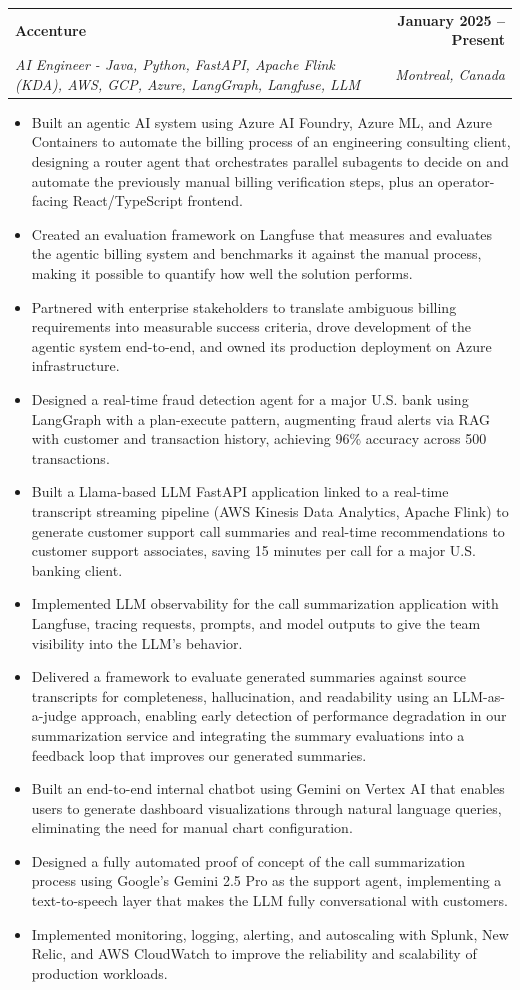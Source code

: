 \documentclass[letterpaper,11pt]{article}
\makeatletter
\newcommand{\resumeItem}[1]{
  \item\small{{#1 \vspace{-2pt}}}
}
\newcommand{\resumeSubheading}[4]{
  \vspace{-2pt}\item
    \begin{tabularx}{1.0\textwidth}[t]{@{}>{\raggedright\arraybackslash}X@{\hspace{8pt}}r@{}}
      \textbf{#1} & \textbf{\small #2} \\
      \textit{\small#3} & \textit{\small #4} \\
    \end{tabularx}\vspace{-7pt}
}
\newcommand{\resumeItemListStart}{\begin{itemize}}
\newcommand{\resumeItemListEnd}{\end{itemize}\vspace{-5pt}}
\makeatother
\begin{document}
    \resumeSubheading
      {Accenture}{January 2025 -- Present}
      {AI Engineer - Java, Python, FastAPI, Apache Flink (KDA), AWS, GCP, Azure, LangGraph, Langfuse, LLM}{Montreal, Canada}
      \resumeItemListStart
        \resumeItem{Built an agentic AI system using Azure AI Foundry, Azure ML, and Azure Containers to automate the billing process of an engineering consulting client, designing a router agent that orchestrates parallel subagents to decide on and automate the previously manual billing verification steps, plus an operator-facing React/TypeScript frontend.}
        \resumeItem{Created an evaluation framework on Langfuse that measures and evaluates the agentic billing system and benchmarks it against the manual process, making it possible to quantify how well the solution performs.}
        \resumeItem{Partnered with enterprise stakeholders to translate ambiguous billing requirements into measurable success criteria, drove development of the agentic system end-to-end, and owned its production deployment on Azure infrastructure.}
        \resumeItem{Designed a real-time fraud detection agent for a major U.S. bank using LangGraph with a plan-execute pattern, augmenting fraud alerts via RAG with customer and transaction history, achieving 96\% accuracy across 500 transactions.}
        \resumeItem{Built a Llama-based LLM FastAPI application linked to a real-time transcript streaming pipeline (AWS Kinesis Data Analytics, Apache Flink) to generate customer support call summaries and real-time recommendations to customer support associates, saving 15 minutes per call for a major U.S. banking client.}
        \resumeItem{Implemented LLM observability for the call summarization application with Langfuse, tracing requests, prompts, and model outputs to give the team visibility into the LLM's behavior.}
        \resumeItem{Delivered a framework to evaluate generated summaries against source transcripts for completeness, hallucination, and readability using an LLM-as-a-judge approach, enabling early detection of performance degradation in our summarization service and integrating the summary evaluations into a feedback loop that improves our generated summaries.}
        \resumeItem{Built an end-to-end internal chatbot using Gemini on Vertex AI that enables users to generate dashboard visualizations through natural language queries, eliminating the need for manual chart configuration.}
        \resumeItem{Designed a fully automated proof of concept of the call summarization process using Google's Gemini 2.5 Pro as the support agent, implementing a text-to-speech layer that makes the LLM fully conversational with customers.}
        \resumeItem{Implemented monitoring, logging, alerting, and autoscaling with Splunk, New Relic, and AWS CloudWatch to improve the reliability and scalability of production workloads.}
      \resumeItemListEnd
      \vspace{-8pt}
\end{document}
